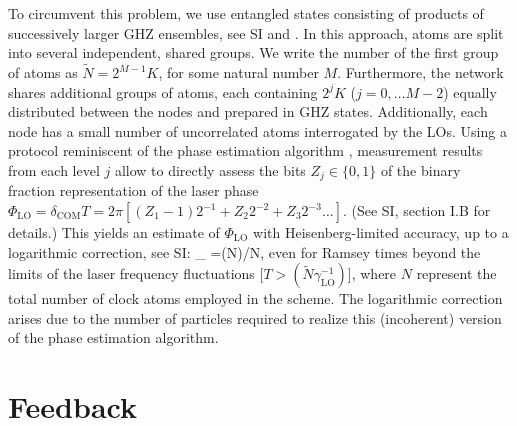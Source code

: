 To circumvent this problem, we use entangled states consisting of products of
successively larger GHZ ensembles, see SI and 
\cite{Kessler2013}. In this approach, 
atoms are split into
several independent, shared groups.
We write the number of the first group of atoms as $\tilde N =2^{M-1} K$, for
some natural number $M$.
Furthermore, the network shares additional groups of atoms, each containing
$2^{j} K$ ($j=0, \hdots M-2$) equally distributed between the nodes and prepared
in GHZ states. 
Additionally, each node has a small number of uncorrelated atoms interrogated by
the LOs. Using a protocol reminiscent of the phase estimation algorithm
\cite{Kessler2013,Nielsen:2000vn, Giedke2006}, measurement results from each
level $j$ allow to directly assess the bits $Z_j \in \{0,1\}$ of the binary
fraction representation of the laser phase $\Phi_\mathrm{LO}=\delta_\mathrm{COM} T
=2\pi [(Z_1-1) 2^{-1} + Z_2 2^{-2} + Z_3 2^{-3} \hdots]$.
(See SI, section I.B for details.)
This
yields an estimate of $\Phi_\mathrm{LO}$ with Heisenberg-limited accuracy, up to a
logarithmic correction, see SI:
\bel 
	\Delta \Phi_ =\log(N)/N,
	\label{eq2}
\eel 
even for Ramsey times beyond the limits of the laser frequency fluctuations [$T
> (\tilde N\gamma_\mathrm{LO}^{-1})$], where $N$ represent the total number of
clock atoms employed in the scheme. The logarithmic correction arises due to the
number of particles required to realize this (incoherent) version of the phase
estimation algorithm.

\section{Feedback}

